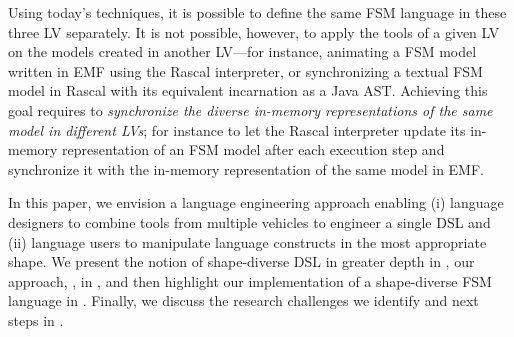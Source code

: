 Using today's techniques, it is possible to define the same FSM language in these three LV separately.
It is not possible, however, to apply the tools of a given LV on the models created in another LV---for instance, animating a FSM model written in EMF using the Rascal interpreter, or synchronizing a textual FSM model in Rascal with its equivalent incarnation as a Java AST.
Achieving this goal requires to \emph{synchronize the diverse in-memory representations of the same model in different LVs}; for instance to let the Rascal interpreter update its in-memory representation of an FSM model after each execution step and synchronize it with the in-memory representation of the same model in EMF.

In this paper, we envision a language engineering approach enabling (i) language designers to combine tools from multiple vehicles to engineer a single DSL and (ii) language users to manipulate language constructs in the most appropriate shape.
We present the notion of shape-diverse DSL in greater depth in , our approach, \prism, in , and then highlight our implementation of a shape-diverse FSM language in .
Finally, we discuss the research challenges we identify and next steps in .

